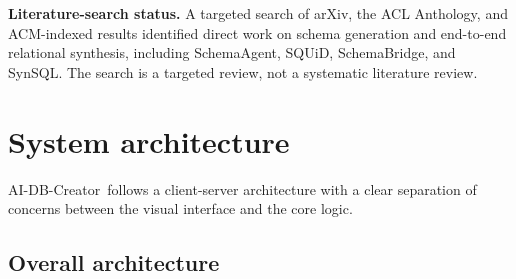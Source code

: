 \documentclass[11pt,a4paper]{article}
\newcommand{\aidb}{AI-DB-Creator}
\begin{document}
\noindent\textbf{Literature-search status.} A targeted search of arXiv, the ACL Anthology, and ACM-indexed results identified direct work on schema generation and end-to-end relational synthesis, including SchemaAgent, SQUiD, SchemaBridge, and SynSQL. The search is a targeted review, not a systematic literature review.

\section{System architecture}
\label{sec:system}
\aidb\ follows a client-server architecture with a clear separation of concerns between the visual interface and the core logic.

\subsection{Overall architecture}
\end{document}
